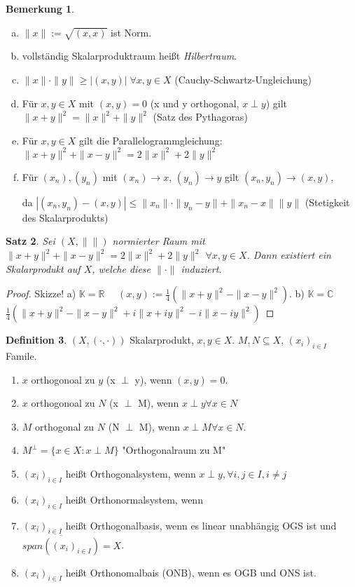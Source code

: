 \documentclass[ngerman]{report}
\theoremstyle{plain}%
\newtheorem{thm}{Satz}[chapter]
\theoremstyle{definition}%
\newtheorem{definition}[thm]{Definition}
\theoremstyle{myStyle}
\newtheorem{bem}[thm]{Bemerkung}
\newcommand{\C}{\mathbb{C}}
\newcommand{\R}{\mathbb{R}}
\newcommand{\K}{\mathbb{K}}
\newcommand{\norm}[1]{\|#1\|}
\newcommand{\qmarks}[1]{"#1"}
\newcommand{\xf}{(x_i)_{i\in I}}
\newcommand{\SP}{(\cdot,\cdot)}
\begin{document}
	\begin{bem}
		\begin{enumerate}[a)]
			\item $\norm{x} := \sqrt{(x,x)}$ ist Norm.
			\item vollständig Skalarproduktraum heißt \textit{Hilbertraum}.
			\item $\norm{x} \cdot \norm{y} \geq |(x,y)| \; \forall x,y \in X$ (Cauchy-Schwartz-Ungleichung)
			\item Für $x,y \in X$ mit $(x,y) = 0$ (x und y orthogonal, $x \perp y$)
			gilt $\norm{x + y}^2 = \norm{x}^2 + \norm{y}^2$ (Satz des Pythagoras)
			\item Für $x,y \in X$ gilt die Parallelogrammgleichung: 
				$\norm{x + y} ^2 + \norm{x - y}^2 = 2 \norm{x}^2 + 2\norm{y}^2$
			\item	Für $(x_n), (y_n)$ mit $(x_n) \to x$, $(y_n) \to y$ gilt 
				$(x_n, y_n) \to (x,y)$, \par 
				da $|(x_n, y_n) - (x,y)| \leq \norm{x_n}\cdot \norm{y_n - y} + \norm{x_n - x}\norm{y}$ (Stetigkeit des Skalarprodukts)
		\end{enumerate}
	\end{bem}
	\begin{thm}
		Sei $(X,\norm{})$ normierter Raum mit $\norm{x+y}^2 + \norm{x-y}^2 = 2 \norm{x}^2 + 2\norm{y}^2$ $\forall x,y \in X$. 
		Dann existiert ein Skalarprodukt auf $X$, welche diese $\norm{\cdot}$ induziert.
	\end{thm}

	\begin{proof}
		Skizze! a) $\K = \R \quad$ $(x,y) := \frac{1}{4}(\norm{x + y}^2 - \norm{x-y}^2)$. 
			b) $\K = \C \quad $ $\frac{1}{4}(\norm{x + y}^2 - \norm{x-y}^2 + i\norm{x + iy}^2 - i\norm{x-iy}^2)$
	\end{proof}

	\begin{definition}
		$(X,\SP)$ Skalarprodukt, $x,y\in X$. $M,N \subseteq X$, $(x_i)_{i\in I}$ Famile.
		\begin{enumerate}
			\item $x$ orthogonoal zu $y$ (x $\perp$ y), wenn $(x,y) = 0$.
			\item $x$ orthogonoal zu $N$ (x $\perp$ M), wenn $x \perp y \forall x\in N$
			\item $M$ orthogonal zu $N$ (N $\perp$ M), wenn $x \perp M \forall x\in N$.
			\item $M^\perp = \{x\in X: x\perp M\}$ \qmarks{Orthogonalraum zu M}
			\item $\xf$ heißt Orthogonalsystem, wenn $x \perp y, \forall i,j \in I, i\neq j$
			\item $\xf$ heißt Orthonormalsystem, wenn 
			\item $\xf$ heißt Orthogonalbasis, wenn es linear unabhängig OGS ist und $\overline{span(\xf)} = X$.
			\item $\xf$ heißt Orthonomalbais (ONB), wenn es OGB und ONS ist.	
		\end{enumerate}
	\end{definition}
\end{document}
